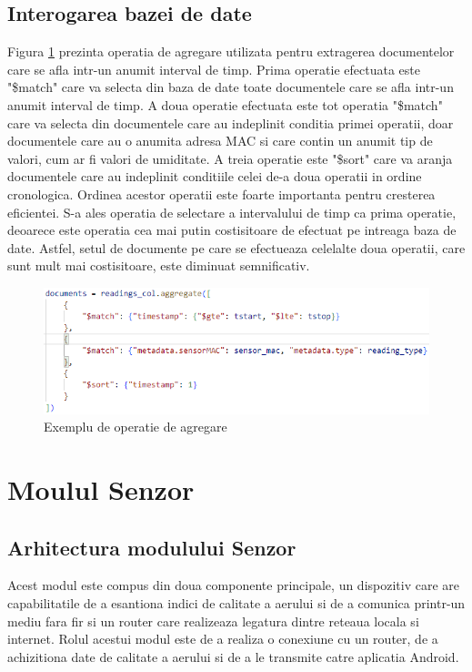 \subsection{Interogarea bazei de date}\label{subsec:pi_bazadedate_interogare}
Figura \ref{fig:PI_AggregationExample} prezinta operatia de agregare utilizata pentru extragerea documentelor care se afla intr-un anumit interval de timp. Prima 
operatie efectuata este "\$match" care va selecta din baza de date toate documentele care se afla intr-un anumit interval de timp. A doua operatie efectuata este 
tot operatia "\$match" care va selecta din documentele care au indeplinit conditia primei operatii, doar documentele care au o anumita adresa MAC si care contin 
un anumit tip de valori, cum ar fi valori de umiditate. A treia operatie este "\$sort" care va aranja documentele care au indeplinit conditiile celei de-a doua 
operatii in ordine cronologica. Ordinea acestor operatii este foarte importanta pentru cresterea eficientei. S-a ales operatia de selectare a intervalului de timp 
ca prima operatie, deoarece este operatia cea mai putin costisitoare de efectuat pe intreaga baza de date. Astfel, setul de documente pe care se efectueaza celelalte 
doua operatii, care sunt mult mai costisitoare, este diminuat semnificativ.
\begin{figure}[H]
    \centering
    \includegraphics[scale=0.7]{figs/PI_AggregationExample.png}
    \caption{Exemplu de operatie de agregare}
    \label{fig:PI_AggregationExample}
\end{figure}

\section{Moulul Senzor}\label{sec:pi_senzor}
\subsection{Arhitectura modulului Senzor}\label{subsec:pi_senzor_arhitectura}
Acest modul este compus din doua componente principale, un dispozitiv care are capabilitatile de a esantiona indici de calitate a aerului si de a comunica 
printr-un mediu fara fir si un router care realizeaza legatura dintre reteaua locala si internet. Rolul acestui modul este de a realiza o conexiune cu un router,
de a achizitiona date de calitate a aerului si de a le transmite catre aplicatia Android. 

